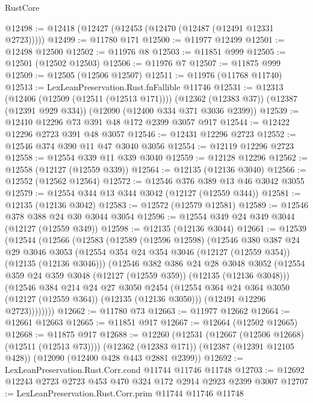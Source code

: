 \begin{lexlean}{RustCore}
\begin{coremodule}
@12498 := @12418 (@12427 (@12453 (@12470 (@12487 (@12491 @12331 @2723)))))
@12499 := @11780 @171
@12500 := @11977 @12499
@12501 := @12498 @12500
@12502 := @11976 @8
@12503 := @11851 @999
@12505 := @12501 (@12502 @12503)
@12506 := @11976 @7
@12507 := @11875 @999
@12509 := @12505 (@12506 @12507)
@12511 := @11976 (@11768 @11740)
@12513 := LexLeanPreservation.Rust.fnFallible @11746
@12531 := @12313
    (@12406 (@12509 (@12511 (@12513 @171))))
    (@12362 (@12383 @37))
    (@12387 (@12391 @929 @334))
    (@12090 (@12400 @334 @371 @3036 @2399))
@12539 := @12410 @12296 @73 @391 @48 @172 @2399 @3057 @917
@12544 := @12422 @12296 @2723 @391 @48 @3057
@12546 := @12431 @12296 @2723
@12552 := @12546 @374 @390 @11 @47 @3040 @3056
@12554 := @12119 @12296 @2723
@12558 := @12554 @339 @11 @339 @3040
@12559 := @12128 @12296
@12562 := @12558 (@12127 (@12559 @339))
@12564 := @12135 (@12136 @3040)
@12566 := @12552 (@12562 @12564)
@12572 := @12546 @376 @389 @13 @46 @3042 @3055
@12579 := @12554 @344 @13 @344 @3042 (@12127 (@12559 @344))
@12581 := @12135 (@12136 @3042)
@12583 := @12572 (@12579 @12581)
@12589 := @12546 @378 @388 @24 @30 @3044 @3054
@12596 := @12554 @349 @24 @349 @3044 (@12127 (@12559 @349))
@12598 := @12135 (@12136 @3044)
@12661 := @12539
    (@12544
      (@12566
        (@12583
          (@12589
            (@12596 @12598)
            (@12546
              @380
              @387
              @24
              @29
              @3046
              @3053
              (@12554 @354 @24 @354 @3046 (@12127 (@12559 @354)) (@12135 (@12136 @3046)))
              (@12546
                @382
                @386
                @24
                @28
                @3048
                @3052
                (@12554 @359 @24 @359 @3048 (@12127 (@12559 @359)) (@12135 (@12136 @3048)))
                (@12546
                  @384
                  @214
                  @24
                  @27
                  @3050
                  @2454
                  (@12554 @364 @24 @364 @3050 (@12127 (@12559 @364)) (@12135 (@12136 @3050)))
                  (@12491 @12296 @2723))))))))
@12662 := @11780 @73
@12663 := @11977 @12662
@12664 := @12661 @12663
@12665 := @11851 @917
@12667 := @12664 (@12502 @12665)
@12668 := @11875 @917
@12688 := @12260
    (@12531 (@12667 (@12506 @12668) (@12511 (@12513 @73))))
    (@12362 (@12383 @171))
    (@12387 (@12391 @12105 @428))
    (@12090 (@12400 @428 @443 @2881 @2399))
@12692 := LexLeanPreservation.Rust.Corr.cond @11744 @11746 @11748
@12703 := @12692 @12243 @2723 @2723 @453 @470 @324 @172 @2914 @2923 @2399 @3007
@12707 := LexLeanPreservation.Rust.Corr.prim @11744 @11746 @11748

\end{coremodule}
\end{lexlean}
